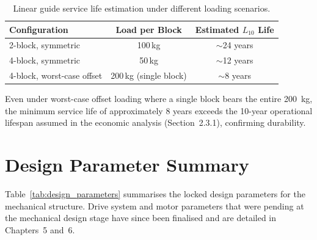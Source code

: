 \begin{table}[H]
    \centering
    \caption{Linear guide service life estimation under different loading scenarios.}
    \label{tab:life_estimation}
    \renewcommand{\arraystretch}{1.2}
    \begin{tabular}{@{}lcc@{}}
        \toprule
        \textbf{Configuration} & \textbf{Load per Block} & \textbf{Estimated $L_{10}$ Life} \\
        \midrule
        2-block, symmetric & 100\,kg & $\sim$24 years \\
        4-block, symmetric & 50\,kg & $\sim$12 years \\
        4-block, worst-case offset & 200\,kg (single block) & $\sim$8 years \\
        \bottomrule
    \end{tabular}
\end{table}

Even under worst-case offset loading where a single block bears the entire \SI{200}{kg}, the minimum service life of approximately 8 years exceeds the 10-year operational lifespan assumed in the economic analysis (Section~2.3.1), confirming durability.

\section{Design Parameter Summary}

Table~\ref{tab:design_parameters} summarises the locked design parameters for the mechanical structure. Drive system and motor parameters that were pending at the mechanical design stage have since been finalised and are detailed in Chapters~5 and~6.

